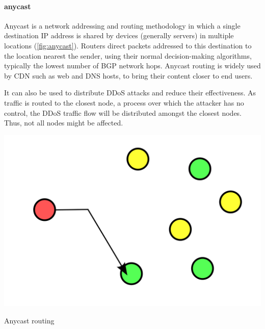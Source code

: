 \paragraph{anycast}
Anycast is a network addressing and routing methodology in which a single destination IP address is shared by devices (generally servers) in multiple locations (\cref{fig:anycast}).
Routers direct packets addressed to this destination to the location nearest the sender, using their normal decision-making algorithms, typically the lowest number of \gls{BGP} network hops.
Anycast routing is widely used by \acf{CDN} such as web and \acs{DNS} hosts, to bring their content closer to end users.

It can also be used to distribute \ac{DDoS} attacks and reduce their effectiveness.
As traffic is routed to the closest node, a process over which the attacker has no control, the \ac{DDoS} traffic flow will be distributed amongst the closest nodes.
Thus, not all nodes might be affected. 


\begin{marginfigure}
\includegraphics[width=\textwidth]{images/introduction/anycast.png}
\caption[Anycast routing scheme]{Anycast routing}
\label{fig:anycast}
\end{marginfigure}



